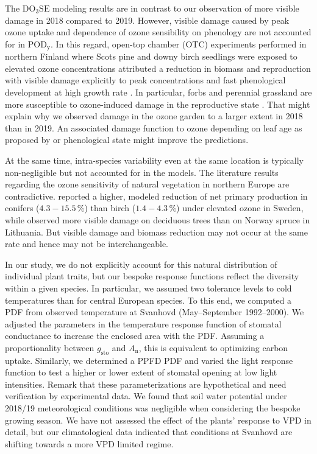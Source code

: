 \documentclass[bg, manuscript]{copernicus}
\begin{document}
 The $\mathrm{DO_3SE}$ modeling results are in contrast to our observation of more visible damage in 2018 compared to 2019. However, visible damage caused by peak ozone uptake and dependence of ozone sensibility on phenology are not accounted for in $\mathrm{POD_y}$. In this regard, open-top chamber (OTC) experiments performed in northern Finland where Scots pine and downy birch seedlings were exposed to elevated ozone concentrations attributed a reduction in biomass and reproduction with visible damage explicitly to peak  concentrations and fast phenological development at high growth rate \citep{Amb:Manninen2009}. In particular, forbs and perennial grassland are more susceptible to ozone-induced damage in the reproductive state \citep{EP:Bassin2004}. 
That might explain why we observed damage in the ozone garden to a larger extent in 2018 than in 2019. An associated damage function to ozone depending on leaf age as proposed by \citet{AE:Musselman2006} or phenological state might improve the predictions.

At the same time, intra-species variability even at the same location is typically non-negligible \citep{EP:Bassin2004} but not accounted for in the models. The literature results regarding the ozone sensitivity of natural vegetation in northern Europe are contradictive. \citet{FS:Subramanian2014} reported a higher, modeled reduction of net primary production in conifers ($4.3-15.5\,\unit{\%}$) than birch ($1.4-4.3\,\unit{\%}$) under elevated ozone in Sweden, while \citet{Amb:Girgzdiene2009} observed more visible damage on deciduous trees than on Norway spruce in Lithuania. But visible damage and biomass reduction may not occur at the same rate and hence may not be interchangeable. 

In our study, we do not explicitly account for this natural distribution of individual plant traits, but our bespoke response functions reflect the diversity within a given species. In particular, we assumed two tolerance levels to cold temperatures than for central European species. To this end, we computed a PDF from observed temperature at Svanhovd (May--September 1992--2000). We adjusted the parameters in the temperature response function of stomatal conductance to increase the enclosed area with the PDF. Assuming a proportionality between $g_\mathrm{sto}$ and $A_\mathrm{n}$, this is equivalent to optimizing carbon uptake. Similarly, we determined a PPFD PDF and varied the light response function to test a higher or lower extent of stomatal opening at low light intensities. Remark that these parameterizations are hypothetical and need verification by experimental data. We found that soil water potential under 2018/19 meteorological conditions was negligible when considering the bespoke growing season. We have not assessed the effect of the plants' response to VPD in detail, but our climatological data indicated that conditions at Svanhovd are shifting towards a more VPD limited regime. 
\end{document}
